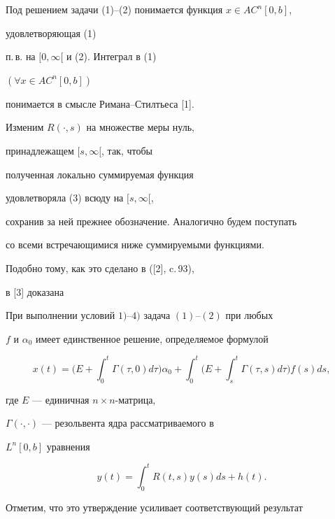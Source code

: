 Под решением задачи (1)--(2) понимается функция $x\in AC^n[0,b]$,


удовлетворяющая (1)


п.\,в. на $[0,\infty[$ и (2). Интеграл в (1)


$(\forall x\in AC^n[0,b])$


понимается в смысле Римана--Стилтьеса [1].





Изменим $R(\cdot,s)$ на множестве меры нуль, 


принадлежащем $[s,\infty[$, так, чтобы


полученная локально суммируемая функция 


удовлетворяла (3) всюду на $[s,\infty[$,


сохранив за ней прежнее обозначение. Аналогично будем поступать


со всеми встречающимися ниже суммируемыми функциями.\par


Подобно тому, как это сделано в ([2], c.\,93),


в [3] доказана





\begin{thm}


При выполнении условий $1)$--$4)$ задача $(1)$--$(2)$ при любых


$f$ и $\alpha_0$ имеет единственное решение, определяемое формулой


\begin{equation}


x(t)=\bigg(E+\int_0^t\Gamma(\tau,0)d\tau\bigg)\alpha_0+\int_0^t


\bigg(E+\int_s^t\Gamma(\tau,s)d\tau\bigg)f(s)ds,


\end{equation}


где $E$ --- единичная $n\times n$-матрица,


$\Gamma(\cdot,\cdot)$ --- резольвента ядра рассматриваемого в


$L^n[0,b]$ уравнения


$$


y(t)=\int_0^tR(t,s)y(s)ds+h(t).


$$


\end{thm}





Отметим, что это утверждение усиливает соответствующий результат


